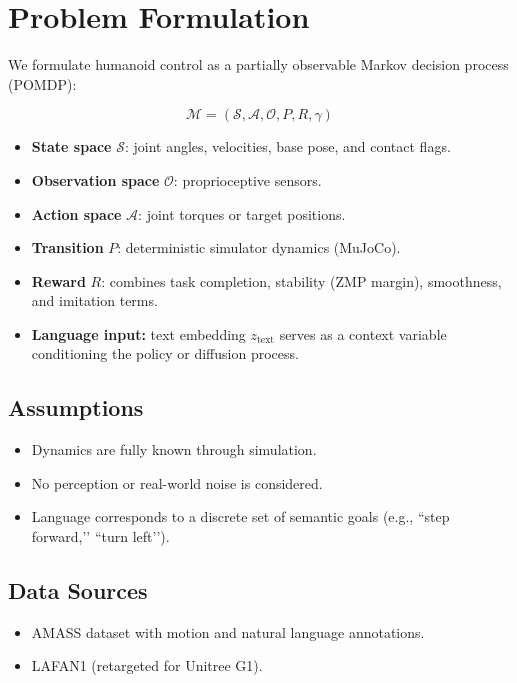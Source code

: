 \section{Problem Formulation}
\label{sec:formulation}

We formulate humanoid control as a partially observable Markov decision process (POMDP):

\[
\mathcal{M} = (\mathcal{S}, \mathcal{A}, \mathcal{O}, P, R, \gamma)
\]

\begin{itemize}
    \item \textbf{State space} $\mathcal{S}$: joint angles, velocities, base pose, and contact flags.
    \item \textbf{Observation space} $\mathcal{O}$: proprioceptive sensors.
    \item \textbf{Action space} $\mathcal{A}$: joint torques or target positions.
    \item \textbf{Transition} $P$: deterministic simulator dynamics (MuJoCo).
    \item \textbf{Reward} $R$: combines task completion, stability (ZMP margin), smoothness, and imitation terms.
    \item \textbf{Language input:} text embedding $z_{\text{text}}$ serves as a context variable conditioning the policy or diffusion process.
\end{itemize}

\subsection{Assumptions}
\begin{itemize}
    \item Dynamics are fully known through simulation.
    \item No perception or real-world noise is considered.
    \item Language corresponds to a discrete set of semantic goals (e.g., ``step forward,’’ ``turn left’’).
\end{itemize}

\subsection{Data Sources}
\begin{itemize}
    \item AMASS \cite{AMASS:ICCV:2019} dataset with motion and natural language annotations.
    \item LAFAN1 \cite{harvey2020robust} (retargeted for Unitree G1).
\end{itemize}

